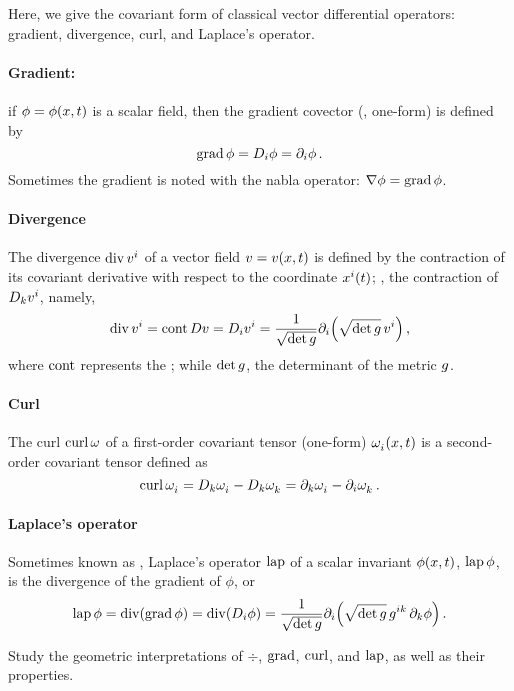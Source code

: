 Here, we give the covariant form of classical vector differential operators: gradient, divergence, curl, and Laplace's operator.

\paragraph{Gradient:} if $\phi = \phi\vat{\pos,t}$ is a scalar field, then the gradient covector (\aka, one-form) is defined by
%
\begin{equation*}
  \operatorname{grad}\phi = D_i\phi
            = \partial_{i}\phi\,.
\end{equation*}
%
Sometimes the gradient is noted with the nabla operator: $\nabla\phi = \operatorname{grad}\phi$.

\paragraph{Divergence} The divergence $\div\tvec vi$ of a vector field $v = v\vat{\pos,t}$ is defined by the contraction of its covariant derivative with respect to the coordinate $\tvec\pos i\vat t$; \ie, the contraction of $D_k\tvec vi$, namely,
%
\begin{equation*}
  \div\tvec vi  = \cont Dv
                = D_i\tvec vi
                = \dfrac{1}{\sqrt{\det\metric}}\ipd i\parens{\sqrt{\det\metric}\,\tvec vi}\,,
\end{equation*}
%
where $\operatorname{cont}$ represents the ; while $\det g$, the determinant of the metric $g$.

\paragraph{Curl} The curl $\operatorname{curl}\omega$ of a first-order covariant tensor (one-form) $\tcov\omega i\vat{\pos,t}$ is a second-order covariant tensor defined as
%
\begin{equation*}
  \curl\tcov\omega i  = D_k\tcov\omega i - D_k\tcov\omega k
                      = \ipd k\tcov\omega i - \ipd i\tcov\omega k\,.
\end{equation*}

\paragraph{Laplace's operator} Sometimes known as , Laplace's operator $\operatorname{lap}$ of a scalar invariant $\phi\vat{\pos,t}$, $\operatorname{lap}\phi$, is the divergence of the gradient of $\phi$, or
%
\begin{equation*}
  \lap\phi  = \div\parens{\grad\phi}
            = \div\parens{D_i\phi}
            = \dfrac{1}{\sqrt{\det\metric}}\ipd i\parens{\sqrt{\det\metric}\,\tvecmet ik\,\ipd k\phi}\,.
\end{equation*}

\begin{remark}
  Study the geometric interpretations of $\div$, $\operatorname{grad}$, $\operatorname{curl}$, and $\operatorname{lap}$, as well as their properties.
\end{remark}



